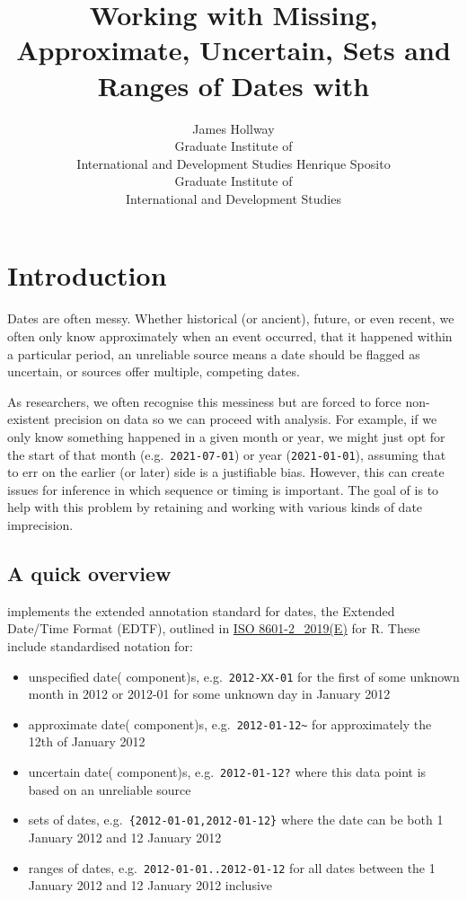 \documentclass[
]{jss}
\author{
James Hollway\\Graduate Institute of\\
International and Development Studies \And Henrique Sposito\\Graduate
Institute of\\
International and Development Studies
}
\title{Working with Missing, Approximate, Uncertain, Sets and Ranges of
Dates with \pkg{messydates}}
\providecommand{\tightlist}{%
  \setlength{\itemsep}{0pt}\setlength{\parskip}{0pt}}
\begin{document}
\hypertarget{introduction}{%
\section{Introduction}\label{introduction}}

Dates are often messy. Whether historical (or ancient), future, or even
recent, we often only know approximately when an event occurred, that it
happened within a particular period, an unreliable source means a date
should be flagged as uncertain, or sources offer multiple, competing
dates.

As researchers, we often recognise this messiness but are forced to
force non-existent precision on data so we can proceed with analysis.
For example, if we only know something happened in a given month or
year, we might just opt for the start of that month
(e.g.~\texttt{2021-07-01}) or year (\texttt{2021-01-01}), assuming that
to err on the earlier (or later) side is a justifiable bias. However,
this can create issues for inference in which sequence or timing is
important. The goal of  is to help with this problem by
retaining and working with various kinds of date imprecision.

\hypertarget{a-quick-overview}{%
\subsection{A quick overview}\label{a-quick-overview}}

 implements the extended annotation standard for dates,
the Extended Date/Time Format (EDTF), outlined in
\href{https://www.iso.org/standard/70908.html}{ISO 8601-2\_2019(E)} for
R. These include standardised notation for:

\begin{itemize}
\tightlist
\item
  unspecified date( component)s, e.g.~\texttt{2012-XX-01} for the first
  of some unknown month in 2012 or 2012-01 for some unknown day in
  January 2012
\item
  approximate date( component)s,
  e.g.~\texttt{2012-01-12\textasciitilde{}} for approximately the 12th
  of January 2012
\item
  uncertain date( component)s, e.g.~\texttt{2012-01-12?} where this data
  point is based on an unreliable source
\item
  sets of dates, e.g.~\texttt{\{2012-01-01,2012-01-12\}} where the date
  can be both 1 January 2012 and 12 January 2012
\item
  ranges of dates, e.g.~\texttt{2012-01-01..2012-01-12} for all dates
  between the 1 January 2012 and 12 January 2012 inclusive
\end{itemize}
\end{document}
